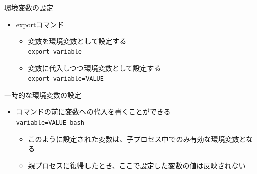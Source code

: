 \documentclass[12pt,aspectratio=169]{beamer}
\begin{document}
\begin{frame}{環境変数の設定}
  \begin{itemize}
    \item exportコマンド
      \begin{itemize}
        \item 変数を環境変数として設定する \\
              \texttt{export variable}
        \item 変数に代入しつつ環境変数として設定する \\
              \texttt{export variable=VALUE}
      \end{itemize}

  \end{itemize}


\end{frame}

\begin{frame}{一時的な環境変数の設定}
  \begin{itemize}
    \item コマンドの前に変数への代入を書くことができる \\
          \texttt{variable=VALUE bash}
      \begin{itemize}
        \item このように設定された変数は、子プロセス中でのみ有効な環境変数となる
        \item 親プロセスに復帰したとき、ここで設定した変数の値は反映されない
      \end{itemize}

  \end{itemize}


\end{frame}
\end{document}
